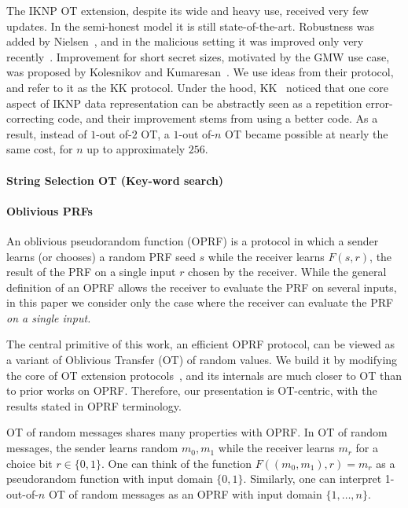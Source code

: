 The IKNP OT extension, despite its wide and heavy use, received very few updates.  In the semi-honest model it is still state-of-the-art.  Robustness was added by Nielsen~\cite{Nielsen07ot}, and in the malicious setting it was improved  only very recently~\cite{EC:ALSZ15,C:KelOrsSch15}.  Improvement for short secret sizes, motivated by the GMW use case, was proposed by Kolesnikov and Kumaresan~\cite{C:KolKum13}.   We use ideas from their protocol, and refer to it as the KK protocol.  Under the hood, KK~\cite{C:KolKum13} noticed that one core aspect of IKNP data representation can be abstractly seen as a repetition error-correcting code, and their improvement stems from using a better code.   As a result, instead of $1$-out of-$2$ OT, a $1$-out of-$n$  OT became possible at nearly the same cost,  for $n$ up to approximately $256$.



\paragraph{String Selection OT (Key-word search)}

\paragraph{Oblivious PRFs}

An oblivious pseudorandom function (OPRF) is a protocol in which a sender
learns (or chooses) a random PRF seed $s$ while the receiver learns $F(s,r)$, the result of the PRF on a single input $r$ chosen by the receiver. While the general definition of an OPRF allows the receiver to evaluate the PRF on several inputs, in this paper we consider only the case where the receiver can evaluate the PRF {\em on a single input.}


The central primitive of this work, an efficient OPRF protocol, can be viewed as a variant of Oblivious Transfer (OT) of random values.  We  build it by modifying the core of OT extension protocols~\cite{C:IKNP03,C:KolKum13}, and its internals are much closer to OT than to prior works on OPRF.  Therefore, our presentation is OT-centric, with the results stated in OPRF terminology.
       

OT of random messages shares many properties with OPRF. In OT of random messages, the sender learns random $m_0, m_1$ while the receiver learns $m_r$ for a choice bit $r \in \{0,1\}$. One can think of the function $F( (m_0, m_1), r ) = m_r$ as a pseudorandom function with input domain $\{0,1\}$. Similarly, one can interpret 1-out-of-$n$ OT of random messages as an OPRF with input domain $\{1,\ldots,n\}$.

